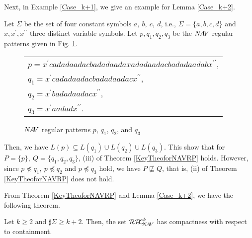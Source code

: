 Next, in Example \ref{Case_k+1}, we give an example for Lemma \ref{Case_k+2}.
\begin{ex}\label{Case_k+1}%
Let $\Sigma$ be the set of four constant symbols $a,~b,~c,~d$, i.e., $\Sigma= \{a, b, c, d \}$ and $x,x^{\prime},x^{\prime\prime}$ three distinct variable symbols.
Let $p,q_{1},q_{2},q_{3}$ be the $N\!A\!V$ regular patterns given in Fig. \ref{Fig:CounterExampleforNAVR}. 
\begin{figure}[tb]
  \begin{tabular}{l}
$p  = x^{\prime}cadadaadacbadadaadaxadadaadacbadadaadabx^{\prime\prime}$,\\
$q_{1} = x^{\prime}cadadaadacbadadaadacx^{\prime\prime}$,\\
$q_{2} = x^{\prime}badadaadacx^{\prime\prime}$,\\
$q_{3} = x^{\prime}aadadx^{\prime\prime}$.
  \end{tabular}
\caption{$N\!A\!V$ regular patterns $p$, $q_{1}$, $q_{2}$, and $q_{3}$}\label{Fig:CounterExampleforNAVR}
\end{figure}
\noindent
Then, we have  $L(p) \subseteq L(q_{1}) \cup L(q_{2}) \cup L(q_{3})$.
This show that for $P=\{p\},~Q=\{q_{1},q_{2},q_{3}\}$, (iii) of Theorem \ref{KeyTheoforNAVRP} holds.
However, since $p \not \preceq q_{1},~p \not \preceq q_{2}$ and $p \not \preceq q_{3}$ hold,
we have $P \not \sqsubseteq Q$, that is, (ii) of Theorem \ref{KeyTheoforNAVRP} does not hold.
\end{ex}

From Theorem \ref{KeyTheoforNAVRP} and Lemma \ref{Case_k+2}, 
we have the following theorem.

\begin{thm}\label{MainTheforNAVRP}
Let $k\ge 2$ and $\sharp\Sigma \ge k+2$.
Then, the set $\mathcal{RP\!\!L}^{k}_{\!N\!A\!V}$ has compactness with respect to containment.
\end{thm}